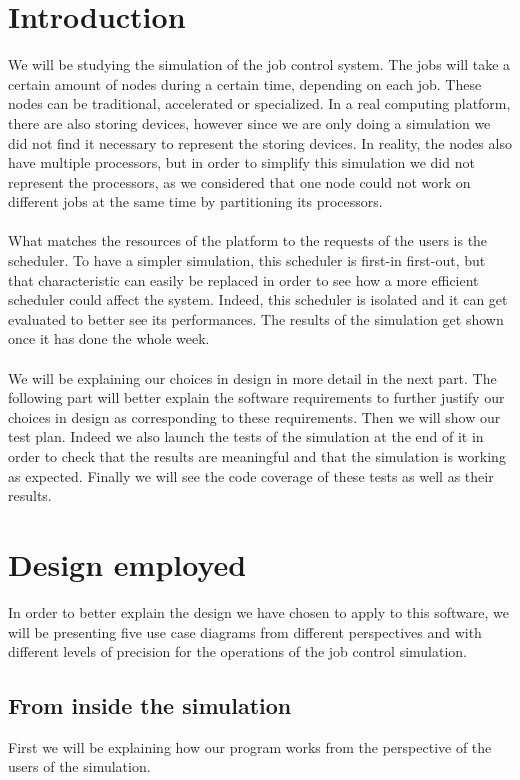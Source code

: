 \documentclass [10 pt, a4 paper]{report}
\begin{document}
\chapter{Introduction}
We will be studying the simulation of the job control system. The jobs will take a certain amount of nodes during a certain time, depending on each job. These nodes can be traditional, accelerated or specialized. In a real computing platform, there are also storing devices, however since we are only doing a simulation we did not find it necessary to represent the storing devices. In reality, the nodes also have multiple processors, but in order to simplify this simulation we did not represent the processors, as we considered that one node could not work on different jobs at the same time by partitioning its processors.
\\ \\
What matches the resources of the platform to the requests of the users is the scheduler. To have a simpler simulation, this scheduler is first-in first-out, but that characteristic can easily be replaced in order to see how a more efficient scheduler could affect the system. Indeed, this scheduler is isolated and it can get evaluated to better see its performances. The results of the simulation get shown once it has done the whole week. 
\\ \\
We will be explaining our choices in design in more detail in the next part. The following part will better explain the software requirements to further justify our choices in design as corresponding to these requirements. Then we will show our test plan. Indeed we also launch the tests of the simulation at the end of it in order to check that the results are meaningful and that the simulation is working as expected. Finally we will see the code coverage of these tests as well as their results.





\chapter{Design employed}
In order to better explain the design we have chosen to apply to this software, we will be presenting five use case diagrams from different perspectives and with different levels of precision for the operations of the job control simulation.

\section{From inside the simulation}
First we will be explaining how our program works from the perspective of the users of the simulation. 
\end{document}
